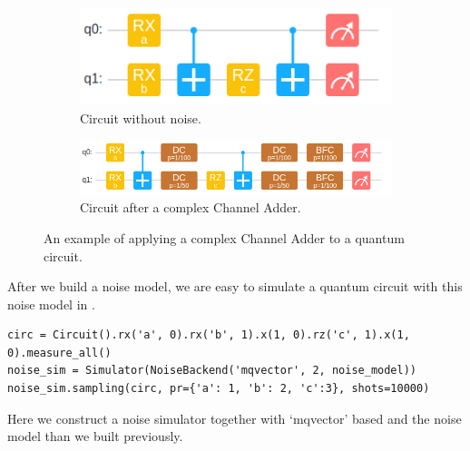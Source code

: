 \begin{figure}
    \centering
    \begin{subfigure}{0.32\textwidth}
        \centering
        \includegraphics[width=\textwidth]{images/4_3_no_complex.png}
        \caption{Circuit without noise.}
    \end{subfigure}
    \begin{subfigure}{0.5\textwidth}
        \centering
        \includegraphics[width=\textwidth]{images/4_3_complex.png}
        \caption{Circuit after a complex Channel Adder.}
    \end{subfigure}
    \caption{An example of applying a complex Channel Adder to a quantum circuit.}
    \label{fig:complex_adder}
\end{figure}

After we build a noise model, we are easy to simulate a quantum circuit with this noise model in \MindQuantum.
\begin{lstlisting}
circ = Circuit().rx('a', 0).rx('b', 1).x(1, 0).rz('c', 1).x(1, 0).measure_all()
noise_sim = Simulator(NoiseBackend('mqvector', 2, noise_model))
noise_sim.sampling(circ, pr={'a': 1, 'b': 2, 'c':3}, shots=10000)
\end{lstlisting}
Here we construct a noise simulator together with `mqvector' based \NoiseBackend and the noise model than we built previously.
